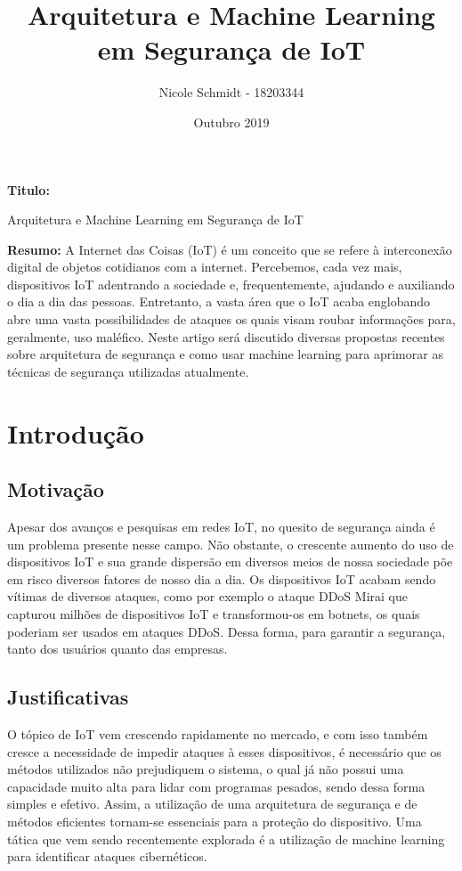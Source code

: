 \documentclass[article,12pt]{abntex2}
\title{Arquitetura e Machine Learning em Segurança de IoT}
\date{Outubro 2019}
\author{Nicole Schmidt - 18203344}
\begin{document}
\maketitle
\textbf{Titulo:}

Arquitetura e Machine Learning em Segurança de IoT

\textbf{Resumo:}
\newline
A Internet das Coisas (IoT) é um conceito que se refere à interconexão digital de objetos cotidianos com a internet. Percebemos, cada vez mais, dispositivos IoT adentrando a sociedade e, frequentemente, ajudando e auxiliando o dia a dia das pessoas. Entretanto, a vasta área que o IoT acaba englobando abre uma vasta possibilidades de ataques os quais visam roubar informações para, geralmente, uso maléfico. Neste artigo será discutido diversas propostas recentes sobre arquitetura de segurança e como usar machine learning para aprimorar as técnicas de segurança utilizadas atualmente.
\section{Introdução}
\subsection{Motivação}
Apesar dos avanços e pesquisas em redes IoT,  no quesito de segurança ainda é um problema presente nesse campo. Não obstante, o crescente aumento do uso de dispositivos IoT e sua grande dispersão em diversos meios de nossa sociedade põe em risco diversos fatores de nosso dia a dia. Os dispositivos IoT acabam sendo vítimas de diversos ataques, como por exemplo o ataque DDoS Mirai que capturou milhões de dispositivos IoT e transformou-os em botnets, os quais poderiam ser usados em ataques DDoS. Dessa forma, para garantir a segurança, tanto dos usuários quanto das empresas. 
\subsection{Justificativas}
O tópico de IoT vem crescendo rapidamente no mercado, e com isso também cresce a necessidade de impedir ataques à esses dispositivos, é necessário que os métodos utilizados não prejudiquem o sistema, o qual já não possui uma capacidade muito alta para lidar com programas pesados, sendo dessa forma simples e efetivo. Assim, a utilização de uma arquitetura de segurança e de métodos eficientes tornam-se essenciais para a proteção do dispositivo. Uma tática que vem sendo recentemente explorada é a utilização de machine learning para identificar ataques cibernéticos.
\end{document}
